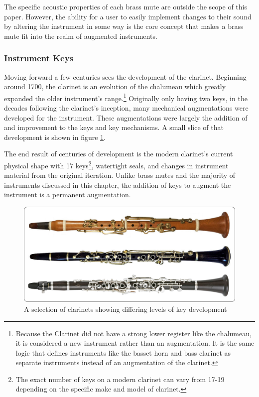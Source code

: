 The specific acoustic properties of each brass mute are outside the scope of this paper. However, the ability for a user to easily implement changes to their sound by altering the instrument in some way is the core concept that makes a brass mute fit into the realm of augmented instruments.

\subsubsection{Instrument Keys}

Moving forward a few centuries sees the development of the clarinet. Beginning around 1700, the clarinet is an evolution of the chalumeau which greatly expanded the older instrument's range.\footnote{Because the Clarinet did not have a strong lower register like the chalumeau, it is considered a new instrument rather than an augmentation. It is the same logic that defines instruments like the basset horn and bass clarinet as separate instruments instead of an augmentation of the clarinet.} Originally only having two keys, in the decades following the clarinet's inception, many mechanical augmentations were developed for the instrument. These augmentations were largely the addition of and improvement to the keys and key mechanisms. A small slice of that development is shown in figure \ref{fig:clKeys}. 

The end result of centuries of development is the modern clarinet's current physical shape with 17 keys\footnote{The exact number of keys on a modern clarinet can vary from 17-19 depending on the specific make and model of clarinet.}, watertight seals, and changes in instrument material from the original iteration. Unlike brass mutes and the majority of instruments discussed in this chapter, the addition of keys to augment the instrument is a permanent augmentation. 

\begin{figure}
    \centering
    \includegraphics[scale=0.07]{diagrams/M-A-O-clarinets.jpg}
    \caption{A selection of clarinets showing differing levels of key development}
    \label{fig:clKeys} %
\end{figure}

